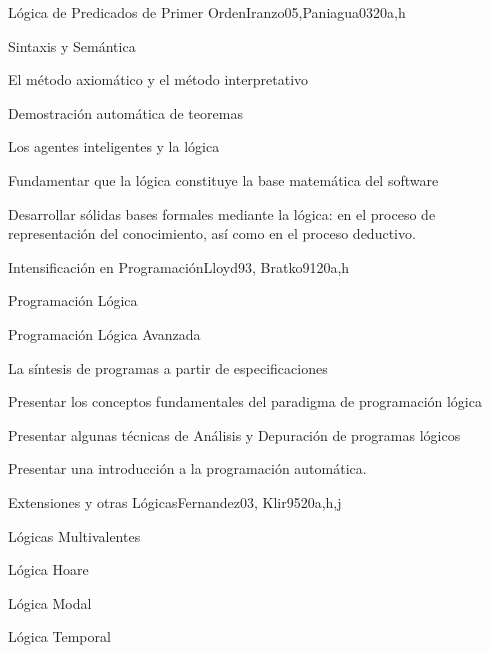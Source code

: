 \begin{syllabus}
\begin{unit}{Lógica de Predicados de Primer Orden}{Iranzo05,Paniagua03}{20}{a,h}
   \begin{topics}
         \item  Sintaxis y Semántica
         \item  El método axiomático y el método interpretativo
         \item  Demostración automática de teoremas
         \item  Los agentes inteligentes y la lógica
   \end{topics}
   \begin{unitgoals}
         \item Fundamentar que la lógica constituye la base matemática del software
         \item Desarrollar sólidas bases formales mediante la lógica: en el proceso de representación del conocimiento, así­ como en el proceso deductivo.
   \end{unitgoals}
\end{unit}

\begin{unit}{Intensificación en Programación}{Lloyd93, Bratko91}{20}{a,h}
   \begin{topics}
         \item Programación Lógica
         \item Programación Lógica Avanzada
         \item La sí­ntesis de programas a partir de especificaciones
   \end{topics}

   \begin{unitgoals}
        \item Presentar los conceptos fundamentales del paradigma de programación lógica
        \item Presentar algunas técnicas de Análisis y Depuración de programas lógicos
        \item Presentar una introducción a la programación automática.
   \end{unitgoals}
\end{unit}

\begin{unit}{Extensiones y otras Lógicas}{Fernandez03, Klir95}{20}{a,h,j}
   \begin{topics}
      \item Lógicas Multivalentes
      \item Lógica Hoare
      \item Lógica Modal
      \item Lógica Temporal
   \end{topics}


\end{unit}
\end{syllabus}
